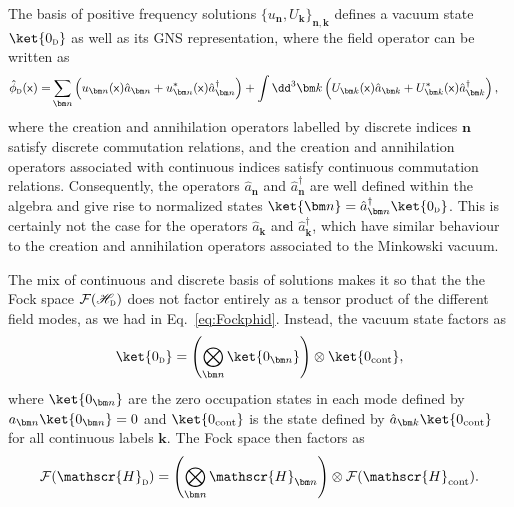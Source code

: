 \documentclass[letterpaper,12pt,titlepage,oneside,final]{book}
\newcommand{\mf}{\mathsf}%
\newcommand{\tc}[1]{\textsc{#1}}
\begin{document}
The basis of positive frequency solutions $\{u_{\bm n},U_{\bm k}\}_{\bm n, \bm k}$ defines a vacuum state $\ket{0_\tc{d}}$ as well as its GNS representation, where the field operator can be written as
\begin{equation}
\begin{aligned}
    \hat{\phi}_\tc{d}(\mf x) =& \sum_{\bm n} \left(u_{\bm n}(\mf x) \hat{a}_{\bm n} + u_{\bm n}^*(\mf x) \hat{a}^\dagger_{\bm n}\right) + \int \dd^3 \bm k \left(U_{\bm k}(\mf x) \hat{a}_{\bm k} +U_{\bm k}^*(\mf x) \hat{a}^\dagger_{\bm k} \right){,}
\end{aligned}
 \label{decomposition}
\end{equation}
where the creation and annihilation operators labelled by discrete indices $\bm n$ satisfy discrete commutation relations, and the creation and annihilation operators associated with continuous indices satisfy continuous commutation relations. Consequently, the operators $\hat{a}_{\bm n}$ and $\hat{a}_{\bm n}^\dagger$ are well defined within the algebra and give rise to normalized states $\ket{\bm n} = \hat{a}_{\bm n}^\dagger\ket{0_\tc{d}}$. This is certainly not the case for the operators $\hat{a}_{\bm k}$ and $\hat{a}_{\bm k}^\dagger$, which have similar behaviour to the creation and annihilation operators associated to the Minkowski vacuum.

The mix of continuous and discrete basis of solutions makes it so that the the Fock space $\mathcal{F}(\mathscr{H}_\tc{d})$ does not factor entirely as a tensor product of the different field modes, as we had in Eq.~\eqref{eq:Fockphid}. Instead, 
the vacuum state factors as
\begin{equation}
    \ket{0_\tc{d}} = \left(\bigotimes_{\bm n} \ket{0_{\bm n}}\right)\otimes \ket{0_{\text{cont}}},
\end{equation}
where $\ket{0_{\bm n}}$ are the zero occupation states in each mode defined by $a_{\bm n}\ket{0_{\bm n}} = 0$ and $\ket{0_\text{cont}}$ is the state defined by $\hat{a}_{\bm k}\ket{0_{\text{cont}}}$ for all continuous labels $\bm k$. The Fock space then factors as
\begin{equation}
    \mathcal{F}(\mathscr{H}_\tc{d}) = \left(\bigotimes_{{\bm n}} \mathscr{H}_{\bm n}\right)\otimes \mathcal{F}(\mathscr{H}_\text{cont}).
\end{equation}
\end{document}
